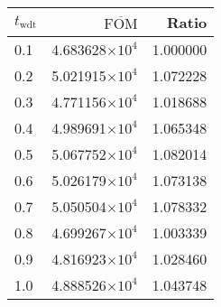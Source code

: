 \begin{tabular}{lrr}
\toprule
$t_{\mathrm{wdt}}$ & $\overline{\mathrm{FOM}}$ &    Ratio \\
\midrule
               0.1 &   4.683628$\times 10^{4}$ & 1.000000 \\
               0.2 &   5.021915$\times 10^{4}$ & 1.072228 \\
               0.3 &   4.771156$\times 10^{4}$ & 1.018688 \\
               0.4 &   4.989691$\times 10^{4}$ & 1.065348 \\
               0.5 &   5.067752$\times 10^{4}$ & 1.082014 \\
               0.6 &   5.026179$\times 10^{4}$ & 1.073138 \\
               0.7 &   5.050504$\times 10^{4}$ & 1.078332 \\
               0.8 &   4.699267$\times 10^{4}$ & 1.003339 \\
               0.9 &   4.816923$\times 10^{4}$ & 1.028460 \\
               1.0 &   4.888526$\times 10^{4}$ & 1.043748 \\
\bottomrule
\end{tabular}
